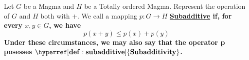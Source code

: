 \label{def:subadditive}
\newcommand{\Subadditive}[0]{
    \bf \hyperref[def:subadditive]{Subadditive} \rm
}

\newcommand{\Subadditivity}[0]{
    \bf \hyperref[def:subadditive]{Subadditivity} \rm
}
\begin{df}[Subadditive]
Let $G$ be a Magma and 
$H$ be a Totally ordered Magma. 
Represent the operation of $G$ and 
$H$ both with $+$. 
We call a mapping $p:G \to H$ \Subadditive if, for every $x,y \in G$, we have 
\begin{equation}
    p(x+y) \leq p(x)+p(y)
\end{equation}
Under these circumstances, we may also say that the operator p posesses $\Subadditivity$. 
\end{df}
